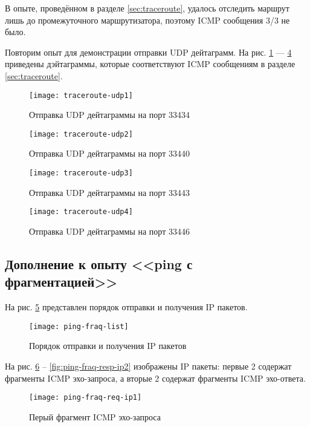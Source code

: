 В опыте, проведённом в разделе \ref{sec:traceroute}, удалось отследить маршрут лишь до промежуточного маршрутизатора, поэтому ICMP сообщения 3/3 не было.

Повторим опыт для демонстрации отправки UDP дейтаграмм. На рис. \ref{fig:trace-udp1} --- \ref{fig:trace-udp4} приведены дэйтаграммы, которые соответствуют ICMP сообщениям в разделе \ref{sec:traceroute}. 

\begin{figure}[H]
	\centering
	\texttt{[image: traceroute-udp1]}
	\caption{Отправка  UDP дейтаграммы на порт 33434}
	\label{fig:trace-udp1}
\end{figure}

\begin{figure}[H]
	\centering
	\texttt{[image: traceroute-udp2]}
	\caption{Отправка  UDP дейтаграммы на порт 33440}
	\label{fig:trace-udp2}
\end{figure}

\begin{figure}[H]
	\centering
	\texttt{[image: traceroute-udp3]}
	\caption{Отправка  UDP дейтаграммы на порт 33443}
	\label{fig:trace-udp3}
\end{figure}

\begin{figure}[H]
	\centering
	\texttt{[image: traceroute-udp4]}
	\caption{Отправка  UDP дейтаграммы на порт 33446}
	\label{fig:trace-udp4}
\end{figure}

\subsection{Дополнение к опыту <<ping с фрагментацией>>}

На рис. \ref{fig:ping-list} представлен порядок отправки и получения IP пакетов.

\begin{figure}[H]
	\centering
	\texttt{[image: ping-fraq-list]}
	\caption{Порядок отправки и получения IP пакетов}
	\label{fig:ping-list}
\end{figure}

На рис. \ref{fig:ping-fraq-req-ip1} -- \ref{fig:ping-fraq-resp-ip2} изображены IP пакеты: первые 2 содержат фрагменты ICMP эхо-запроса, а вторые 2 содержат фрагменты ICMP эхо-ответа.

\begin{figure}[H]
	\centering
	\texttt{[image: ping-fraq-req-ip1]}
	\caption{Перый фрагмент ICMP эхо-запроса}
	\label{fig:ping-fraq-req-ip1}
\end{figure}

